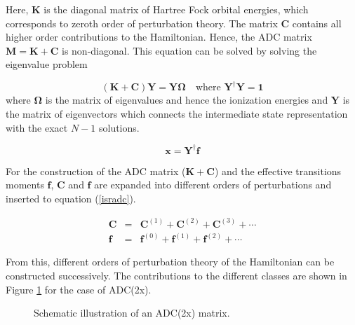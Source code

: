 Here, $\mathbf{K}$ is the diagonal matrix of Hartree Fock orbital energies, which
corresponds to zeroth order of perturbation theory. The matrix $\mathbf{C}$
contains all higher order contributions to the Hamiltonian.
Hence, the ADC matrix $\mathbf{M} = \mathbf{K}+\mathbf{C}$ is non-diagonal.
This equation can be solved by
solving the eigenvalue problem

\begin{equation}\label{adcewp}
(\mathbf{K}+\mathbf{C}) \mathbf{Y} = \mathbf{Y}\mathbf{\Omega} \quad\text{where } \mathbf{Y}^\dagger\mathbf{Y}=\mathbf{1}
\end{equation}
where $\mathbf{\Omega}$ is the matrix of eigenvalues and hence the ionization
energies and $\mathbf{Y}$ is the matrix of eigenvectors which connects the
intermediate state representation with the exact $N-1$ solutions.

\begin{equation}
 \mathbf{x} = \mathbf{Y}^\dagger \mathbf{f}
\end{equation}

For the construction of the \ac{ADC} matrix ($\mathbf{K}+\mathbf{C}$) and the
effective transitions moments $\mathbf{f}$, $\mathbf{C}$ and $\mathbf{f}$
are expanded into different orders of perturbations and inserted to equation
(\ref{isradc}).

\begin{eqnarray}
\mathbf{C} &=& \mathbf{C}^{(1)} + \mathbf{C}^{(2)} + \mathbf{C}^{(3)} + \cdots\label{stC}\\
\mathbf{f} &=& \mathbf{f}^{(0)} + \mathbf{f}^{(1)} + \mathbf{f}^{(2)} + \cdots\label{stf}
\end{eqnarray}

From this, different orders of perturbation theory of the Hamiltonian can be
constructed successively. The contributions to the different classes are shown
in Figure \ref{figure:adcmat_pgf} for the case of \ac{ADC}(2x).

\begin{figure}[h]
  \centering
  
  \caption{Schematic illustration of an \ac{ADC}(2x) matrix.}
  \label{figure:adcmat_pgf}
\end{figure}

